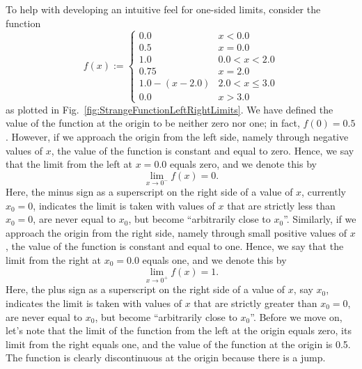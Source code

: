 To help with developing an intuitive feel for one-sided limits, consider the function
\begin{equation}
\label{eq:StrangeFunctionLeftRightLimits}
    f(x) :=  \begin{cases}
        0.0 & x < 0.0 \\
        0.5 & x = 0.0 \\
        1.0 & 0.0 < x < 2.0 \\
        0.75 & x = 2.0 \\
        1.0 - (x-2.0) & 2.0 < x \le 3.0 \\
        0.0 & x > 3.0
    \end{cases}
\end{equation}
as plotted in Fig.~\ref{fig:StrangeFunctionLeftRightLimits}. We have defined the value of the function at the origin to be neither zero nor one; in fact, $f(0)=0.5$. However, if we approach the origin from the left side, namely through negative values of $x$, the value of the function is constant and equal to zero. Hence, we say that the limit from the left at $x=0.0$ equals zero, and we denote this by
\begin{equation}
    \lim_{x \to 0^-} f(x) = 0.
\end{equation}
Here, the minus sign as a superscript on the right side of a value of $x$, currently $x_0=0$, indicates the limit is taken with values of $x$ that are strictly less than $x_0=0$, are never equal to $x_0$, but become ``arbitrarily close to $x_0$''.
Similarly, if we approach the origin from the right side, namely through small positive values of $x$, the value of the function is constant and equal to one. Hence, we say that the limit from the right at $x_0=0.0$ equals one, and we denote this by
\begin{equation}
    \lim_{x \to 0^+} f(x) = 1.
\end{equation}
Here, the plus sign as a superscript on the right side of a value of $x$, say $x_0$, indicates the limit is taken with values of $x$ that are strictly greater than $x_0=0$, are never equal to $x_0$, but become ``arbitrarily close to $x_0$''. Before we move on, let's note that the limit of the function from the left at the origin equals zero, its limit from the right equals one, and the value of the function at the origin is 0.5. The function is clearly discontinuous at the origin because there is a jump.

